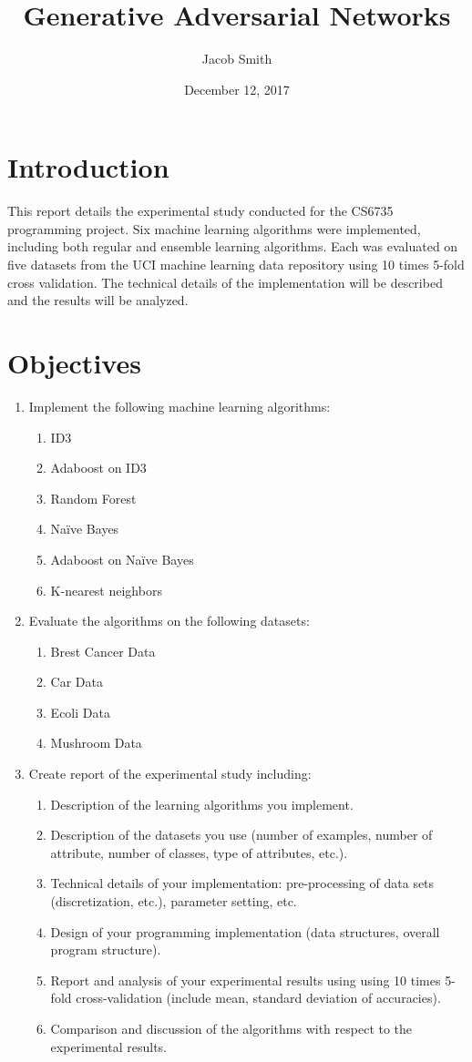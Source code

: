 \documentclass[11pt]{article}
\title{Generative Adversarial Networks}
\author{Jacob Smith}
\date{December 12, 2017}
\begin{document}
\maketitle

\section{Introduction}
This report details the experimental study conducted for the CS6735 programming project. Six machine learning algorithms were implemented, including both regular and ensemble learning algorithms. Each was evaluated on five datasets from the UCI machine learning data repository using 10 times 5-fold cross validation. The technical details of the implementation will be described and the results will be analyzed.

\section{Objectives}
\begin{enumerate}
  \item Implement the following machine learning algorithms:
  \begin{enumerate}
    \item ID3
    \item Adaboost on ID3
    \item Random Forest
    \item Naïve Bayes
    \item Adaboost on Naïve Bayes
    \item K-nearest neighbors
  \end{enumerate}
  \item Evaluate the algorithms on the following datasets:
  \begin{enumerate}
    \item Brest Cancer Data
    \item Car Data
    \item Ecoli Data
    \item Mushroom Data
  \end{enumerate}
  \item Create report of the experimental study including:
  \begin{enumerate}
    \item Description of the learning algorithms you implement.
    \item Description of the datasets you use (number of examples, number of attribute, number of classes, type of attributes, etc.).
    \item Technical details of your implementation: pre-processing of data sets (discretization, etc.), parameter setting, etc.
    \item Design of your programming implementation (data structures, overall program structure).
    \item Report and analysis of your experimental results using using 10 times 5-fold cross-validation (include mean, standard deviation of accuracies).
    \item Comparison and discussion of the algorithms with respect to the experimental results.
  \end{enumerate}
\end{enumerate}
\end{document}
